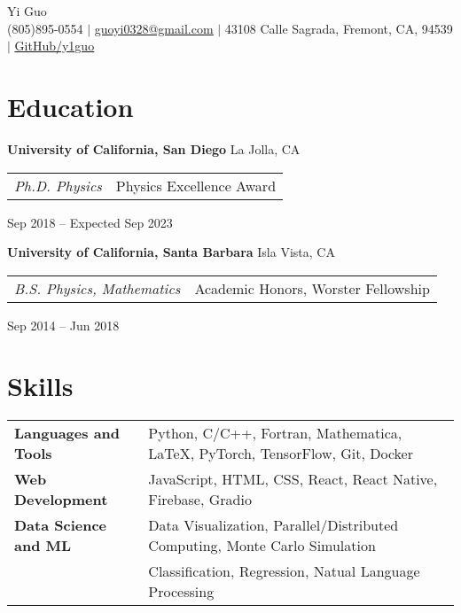 \documentclass[letterpaper,12pt]{article}
\begin{document}
\newcommand{\name}{Yi Guo}
\newcommand{\phone}{(805)895-0554}
\newcommand{\email}{guoyi0328@gmail.com}
\newcommand{\address}{43108 Calle Sagrada, Fremont, CA, 94539}
\newcommand{\github}{y1guo}
\newcommand{\linkedin}{y1guo}
\newcommand{\website}{https://y1guo.github.io}

\begin{center}
    \Huge \name \\
    \vspace{1pt}
    \small \phone 
    $|$ \href{mailto:\email}{\underline{\email}} 
    $|$ \address
    $|$ \href{https://github.com/\github}{\underline{GitHub/\github}} 
    \vspace{-15pt}
\end{center}


\section{Education}

\textbf{University of California, San Diego} \hfill La Jolla, CA \\
\begin{tabular}{p{12em} p{20em}}
    \textit{Ph.D. Physics} 
    & Physics Excellence Award 
\end{tabular}
\hfill Sep 2018 -- Expected Sep 2023

\textbf{University of California, Santa Barbara} \hfill Isla Vista, CA \\
\begin{tabular}{p{12em} p{20em}}
    \textit{B.S. Physics, Mathematics}
    & Academic Honors, Worster Fellowship
\end{tabular}
\hfill Sep 2014 -- Jun 2018


\section{Skills}

\begin{tabular}{p{10em} p{33em}}
    \textbf{Languages and Tools} 
    & Python, C/C++, Fortran, Mathematica, \LaTeX, PyTorch, TensorFlow, Git, Docker \\
    \textbf{Web Development}
    & JavaScript, HTML, CSS, React, React Native, Firebase, Gradio \\
    \textbf{Data Science and ML} 
    & Data Visualization, Parallel/Distributed Computing, Monte Carlo Simulation \\
    & Classification, Regression, Natual Language Processing
\end{tabular}
\end{document}

